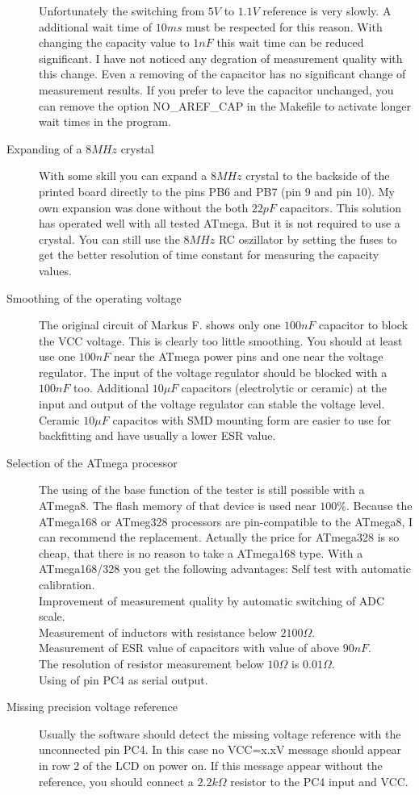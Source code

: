 \begin{description}
Unfortunately the switching from \(5V\) to \(1.1V\) reference is very slowly. A additional
wait time of \(10ms\) must be respected for this reason.
With changing the capacity value to \(1nF\) this wait time can be reduced significant.
I have not noticed any degration of measurement quality with this change.
Even a removing of the capacitor has no significant change of measurement results.
If you prefer to leve the capacitor unchanged, you can remove the option NO\_AREF\_CAP
in the Makefile to activate longer wait times in the program.
\item[Expanding of a \(8MHz\) crystal]
With some skill you can expand a \(8MHz\) crystal to the backside of the printed board
directly to the pins PB6 and PB7 (pin 9 and pin 10).
My own expansion was done without the both \(22pF\) capacitors.
This solution has operated well with all tested ATmega.
But it is not required to use a crystal. You can still use the \(8MHz\) RC oszillator
by setting the fuses to get the better resolution of time constant for measuring  the capacity values.
\item[Smoothing of the operating voltage]
The original circuit of Markus F. shows only one \(100nF\) capacitor to block the VCC voltage.
This is clearly too little smoothing. You should at least use one \(100nF\) near the ATmega power pins
and one near the voltage regulator. The input of the voltage regulator should be
blocked with a \(100nF\) too.
Additional \(10\mu F\) capacitors (electrolytic or ceramic) at the input and
output of the voltage regulator can stable the voltage level.
Ceramic \(10\mu F\) capacitos with SMD mounting form are easier to use for backfitting
and have usually a lower ESR value. 
\item[Selection of the ATmega processor]
The using of the base function of the tester is still possible with a ATmega8.
The flash memory of that device is used near \(100\%\).
Because the ATmega168 or ATmeg328 processors are pin-compatible to the ATmega8,
I can recommend the replacement.
Actually the price for ATmega328 is so cheap, that there is no reason to take
a ATmega168 type.
With a ATmega168/328 you get the following advantages:
Self test with automatic calibration.\\
Improvement of measurement quality by automatic switching of ADC scale.\\
Measurement of inductors with resistance  below \(2100\Omega\).\\
Measurement of ESR value of capacitors with value of above  \(90nF\).\\
The resolution of resistor measurement below \(10\Omega\) is \(0.01\Omega\).\\
Using of pin PC4 as serial output.\\
\item[Missing precision voltage reference]
Usually the software should detect the missing voltage reference with the unconnected pin PC4.
In this case no VCC=x.xV message should appear in row 2 of the LCD on power on.
If this message appear without the reference, you should connect a \(2.2k\Omega\) resistor
to the PC4 input and VCC.


\end{description}

